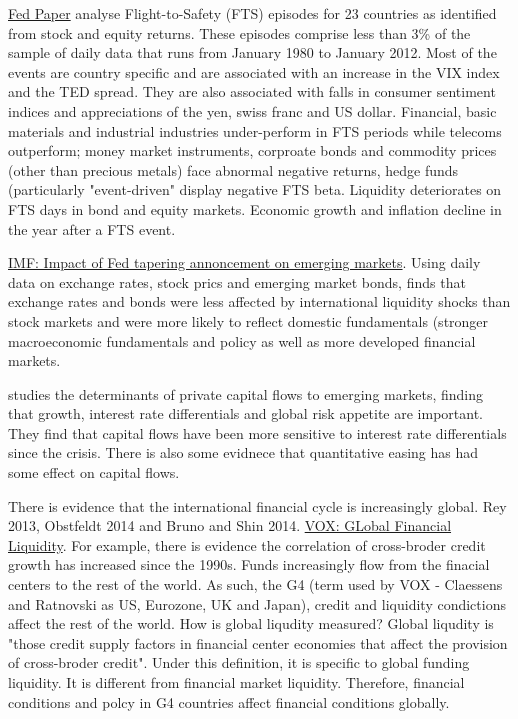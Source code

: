 \documentclass[12pt, a4paper, oneside]{article} %
\begin{document}
\href{http://www.federalreserve.gov/pubs/feds/2014/201446/201446abs.html}{Fed Paper} \citet{FTS} analyse Flight-to-Safety (FTS) episodes for 23 countries as identified from stock and equity returns.  These episodes comprise less than 3\% of the sample of daily data that runs from January 1980 to January 2012. Most of the events are country specific and are associated with an increase in the VIX index and the TED spread.  They are also associated with falls in consumer sentiment indices and appreciations of the yen, swiss franc and US dollar. Financial, basic materials and industrial industries under-perform in FTS periods while telecoms outperform; money market instruments, corproate bonds and commodity prices (other than precious metals) face abnormal negative returns, hedge funds (particularly "event-driven" display negative FTS beta.  Liquidity deteriorates on FTS days in bond and equity markets. Economic growth and inflation decline in the year after a FTS event. 

\href{http://www.imf.org/external/pubs/cat/longres.aspx?sk=41655.0}{IMF:  Impact of Fed tapering annoncement on emerging markets}.  Using daily data on exchange rates, stock prics and emerging market bonds, \citet{Tapering} finds that exchange rates and bonds were less affected by international liquidity shocks than stock markets and were more likely to reflect domestic fundamentals (stronger macroeconomic fundamentals and policy as well as more developed financial markets. 

\citet{Ahmed2014} studies the determinants of private capital flows to emerging markets, finding that growth, interest rate differentials and global risk appetite are important.  They find that capital flows have been more sensitive to interest rate differentials since the crisis. There is also some evidnece that quantitative easing has had some effect on capital flows. 

There is evidence that the international financial cycle is increasingly global.  Rey 2013, Obstfeldt 2014 and Bruno and Shin 2014.  \href{http://www.voxeu.org/article/primer-global-liquidity}{VOX: GLobal Financial Liquidity}. For example, there is evidence the correlation of cross-broder credit growth has increased since the 1990s. Funds increasingly flow from the finacial centers to the rest of the world. As such, the G4 (term used by VOX - Claessens and Ratnovski as US, Eurozone, UK and Japan), credit and liquidity condictions affect the rest of the world. How is global liqudity measured? Global liqudity is "those credit supply factors in financial center economies that affect the provision of cross-broder credit".  Under this definition, it is specific to global funding liquidity. It is different from financial market liquidity. Therefore, financial conditions and polcy in G4 countries affect financial conditions globally. 
\end{document}
